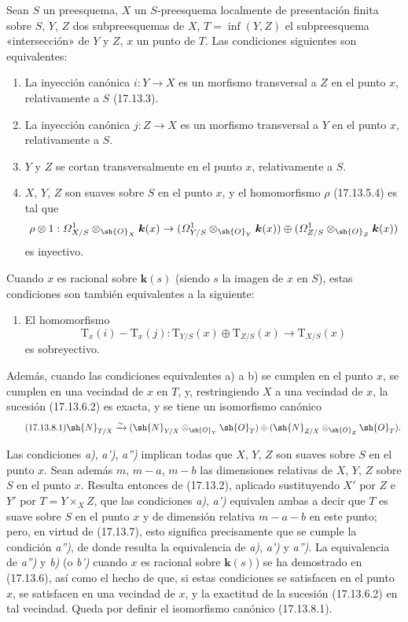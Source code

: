 \begin{proposition}[17.13.8]
\label{IV.17.13.8}
Sean $S$ un preesquema, $X$ un $S$-preesquema localmente de presentación finita sobre $S$, $Y$, $Z$ dos subpreesquemas de $X$, $T=\inf(Y,Z)$ el subpreesquema «intersección» de $Y$ y $Z$, $x$ un punto de $T$. Las condiciones siguientes son equivalentes:
\begin{enumerate}
  \item[\textup{a)}] La inyección canónica $i:Y\to X$ es un morfismo transversal a $Z$ en el punto $x$, relativamente a $S$ \textup{(17.13.3)}.
  \item[\textup{a$'$)}] La inyección canónica $j:Z\to X$ es un morfismo transversal a $Y$ en el punto $x$, relativamente a $S$.
  \item[\textup{a$''$)}] $Y$ y $Z$ se cortan transversalmente en el punto $x$, relativamente a $S$.
  \item[\textup{b)}] $X$, $Y$, $Z$ son suaves sobre $S$ en el punto $x$, y el homomorfismo $\rho$ \textup{(17.13.5.4)} es tal que
  \[
  \rho\otimes1:\varOmega^1_{X/S}\otimes_{\sh{O}_X}\boldsymbol{k}(x)\to
  (\varOmega^1_{Y/S}\otimes_{\sh{O}_Y}\boldsymbol{k}(x))\oplus
  (\varOmega^1_{Z/S}\otimes_{\sh{O}_Z}\boldsymbol{k}(x))
  \]
  es inyectivo.
\end{enumerate}
Cuando $x$ es racional sobre $\boldsymbol{k}(s)$ \textup{(}siendo $s$ la imagen de $x$ en $S$\textup{)}, estas condiciones son también equivalentes a la siguiente:
\begin{enumerate}
  \item[\textup{b$'$)}] El homomorfismo
  \[
  \mathrm{T}_x(i)-\mathrm{T}_x(j):\mathrm{T}_{Y/S}(x)\oplus\mathrm{T}_{Z/S}(x)\to\mathrm{T}_{X/S}(x)
  \]
  es sobreyectivo.
\end{enumerate}
Además, cuando las condiciones equivalentes \textup{a)} a \textup{b)} se cumplen en el punto $x$, se cumplen en una vecindad de $x$ en $T$, y, restringiendo $X$ a una vecindad de $x$, la sucesión \textup{(17.13.6.2)} es exacta, y se tiene un isomorfismo canónico
\[
\label{IV.17.13.8.1}
\tag{17.13.8.1}
\sh{N}_{T/X}\xrightarrow{\sim}
(\sh{N}_{Y/X}\otimes_{\sh{O}_Y}\sh{O}_T)\oplus
(\sh{N}_{Z/X}\otimes_{\sh{O}_Z}\sh{O}_T).
\]
\end{proposition}

Las condiciones \emph{a)}, \emph{a')}, \emph{a'')} implican todas que $X$, $Y$, $Z$ son suaves sobre $S$ en el punto $x$. Sean además $m$, $m-a$, $m-b$ las dimensiones relativas de $X$, $Y$, $Z$ sobre $S$ en el punto $x$. Resulta entonces de (17.13.2), aplicado sustituyendo $X'$ por $Z$ e $Y'$ por $T=Y\times_XZ$, que las condiciones \emph{a)}, \emph{a')} equivalen ambas a decir que $T$ es suave sobre $S$ en el punto $x$ y de dimensión relativa $m-a-b$ en este punto; pero, en virtud de (17.13.7), esto significa precisamente que se cumple la condición \emph{a'')}, de donde resulta la equivalencia de \emph{a)}, \emph{a')} y \emph{a'')}. La equivalencia de \emph{a'')} y \emph{b)} (o \emph{b')} cuando $x$ es racional sobre $\boldsymbol{k}(s)$) se ha demostrado en (17.13.6), así como el hecho de que, si estas condiciones se satisfacen en el punto $x$, se satisfacen en una vecindad de $x$, y la exactitud de la sucesión (17.13.6.2) en tal vecindad. Queda por definir el isomorfismo canónico (17.13.8.1).

